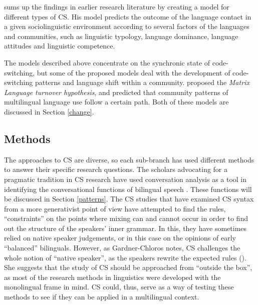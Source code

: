 \documentclass[output=paper,
modfonts
]{langscibook}
\begin{document}
\cite{muysken2000,muysken2013language} sums up the findings in earlier research literature by creating a model for different types of CS. His model predicts the outcome of the language contact in a given sociolinguistic environment according to several factors of the languages and communities, such as linguistic typology, language dominance, language attitudes and linguistic competence.

The models described above concentrate on the synchronic state of code-switching, but some of the proposed models deal with the development of code-switching patterns and language shift within a community. \cite{myers1997duelling} proposed the \textit{Matrix Language turnover hypothesis}, and \cite{auer1999codeswitching} predicted that community patterns of multilingual language use follow a certain path. Both of these models are discussed in Section \ref{change}. 

\subsection{Methods}
The approaches to CS are diverse, so each sub-branch has used different methods to answer their specific research questions. The scholars advocating for a pragmatic tradition in CS research have used conversation analysis as a tool in identifying the conversational functions of bilingual speech \parencite{auer1988conversation,auer1998code}. These functions will be discussed in Section \ref{patterns}. The CS studies that have examined CS syntax from a more generativist point of view have attempted to find the rules, “constraints” on the points where mixing can and cannot occur in order to find out the structure of the speakers' inner grammar. In this, they have sometimes relied on native speaker judgements, or in this case on the opinions of early “balanced” bilinguals. However, as Gardner-Chloros notes, CS challenges the whole notion of  “native speaker”, as the speakers rewrite the expected rules (\citeyear[pp. 18]{gardner2009code}). She suggests that the study of CS should be approached from “outside the box”, as most of the research methods in linguistics were developed with the monolingual frame in mind. CS could, thus, serve as a way of testing these methods to see if they can be applied in a multilingual context. 
\end{document}
